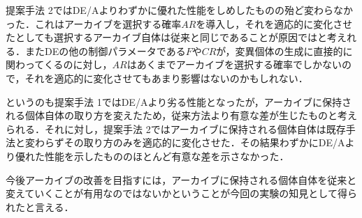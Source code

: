 \documentclass[a4paper,11pt,oneside,openany]{jsbook}
\begin{document}
提案手法 2ではDE/Aよりわずかに優れた性能をしめしたものの殆ど変わらなかった．これはアーカイブを選択する確率$AR$を導入し，それを適応的に変化させたとしても選択するアーカイブ自体は従来と同じであることが原因ではと考えれる．またDEの他の制御パラメータである$F$や$CR$が，変異個体の生成に直接的に関わってくるのに対し，$AR$はあくまでアーカイブを選択する確率でしかないので，それを適応的に変化させてもあまり影響はないのかもしれない．

というのも提案手法 1ではDE/Aより劣る性能となったが，アーカイブに保持される個体自体の取り方を変えたため，従来方法より有意な差が生じたものと考えられる．それに対し，提案手法 2ではアーカイブに保持される個体自体は既存手法と変わらずその取り方のみを適応的に変化させた．その結果わずかにDE/Aより優れた性能を示したもののほとんど有意な差を示さなかった．

今後アーカイブの改善を目指すには，アーカイブに保持される個体自体を従来と変えていくことが有用なのではないかということが今回の実験の知見として得られたと言える．
\end{document}
